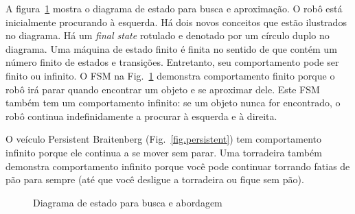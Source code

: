 A figura~\ref{fig.search-approach} mostra o diagrama de estado para busca e aproximação. O robô está inicialmente procurando à esquerda. Há dois novos conceitos que estão ilustrados no diagrama. Há um \emph{final state} rotulado  e denotado por um círculo duplo no diagrama. Uma máquina de estado finito é finita no sentido de que contém um número finito de estados e transições. Entretanto, seu comportamento pode ser finito ou infinito. O FSM na Fig.~\ref{fig.search-approach} demonstra comportamento finito porque o robô irá parar quando encontrar um objeto e se aproximar dele. Este FSM também tem um comportamento infinito: se um objeto nunca for encontrado, o robô continua indefinidamente a procurar à esquerda e à direita.

O veículo Persistent Braitenberg (Fig.~\ref{fig.persistent}) tem comportamento infinito porque ele continua a se mover sem parar. Uma torradeira também demonstra comportamento infinito porque você pode continuar torrando fatias de pão para sempre (até que você desligue a torradeira ou fique sem pão).

\begin{figure}
\begin{center}
\caption{Diagrama de estado para busca e abordagem}\label{fig.search-approach}
\end{center}
\end{figure}

